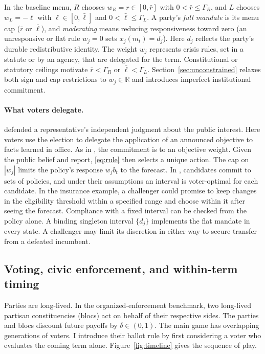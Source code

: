 \documentclass[11pt,letterpaper]{article}
\begin{document}
In the baseline menu, $R$ chooses $w_R=r\in[0,\bar r]$ with $0<\bar r\le\Gamma_R$, and $L$ chooses $w_L=-\ell$ with $\ell\in[0,\bar\ell]$ and $0<\bar\ell\le\Gamma_L$. A party's \emph{full mandate} is its menu cap ($\bar r$ or $\bar\ell$), and \emph{moderating} means reducing responsiveness toward zero (an unresponsive or flat rule $w_j=0$ sets $x_j(m_t)=d_j$). Here $d_j$ reflects the party's durable redistributive identity. The weight $w_j$ represents crisis rules, set in a statute or by an agency, that are delegated for the term. Constitutional or statutory ceilings motivate $\bar r<\Gamma_R$ or $\bar\ell<\Gamma_L$. Section~\ref{sec:unconstrained} relaxes both sign and cap restrictions to $w_j\in\mathbb R$ and introduces imperfect institutional commitment.

\paragraph{What voters delegate.}
\citet{burkebristol} defended a representative's independent judgment about the public interest. Here voters use the election to delegate the application of an announced objective to facts learned in office. As in \citet{rogoff}, the commitment is to an objective weight. Given the public belief and report, \eqref{eq:rule} then selects a unique action. The cap on $|w_j|$ limits the policy's response $w_j b_t$ to the forecast. In \citet*{kartikvw}, candidates commit to sets of policies, and under their assumptions an interval is voter-optimal for each candidate. In the insurance example, a challenger could promise to keep changes in the eligibility threshold within a specified range and choose within it after seeing the forecast. Compliance with a fixed interval can be checked from the policy alone. A binding singleton interval $\{d_j\}$ implements the flat mandate in every state. A challenger may limit its discretion in either way to secure transfer from a defeated incumbent.

\subsection{Voting, civic enforcement, and within-term timing}

Parties are long-lived. In the organized-enforcement benchmark, two long-lived partisan constituencies (blocs) act on behalf of their respective sides. The parties and blocs discount future payoffs by $\delta\in(0,1)$. The main game has overlapping generations of voters. I introduce their ballot rule by first considering a voter who evaluates the coming term alone. Figure~\ref{fig:timeline} gives the sequence of play.
\end{document}
